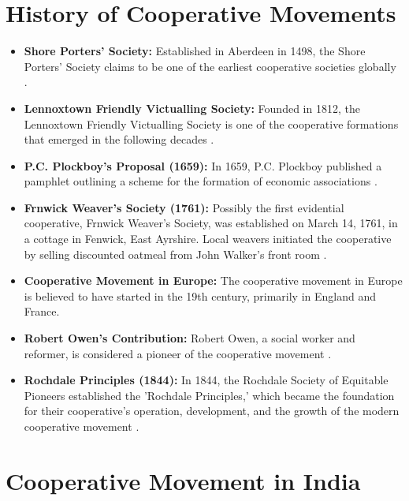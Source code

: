 
\section{History of Cooperative Movements}

\begin{itemize}
    \item \textbf{Shore Porters’ Society:} Established in Aberdeen in 1498, the Shore Porters’ Society claims to be one of the earliest cooperative societies globally \cite{WalesCC}.
    
    \item \textbf{Lennoxtown Friendly Victualling Society:} Founded in 1812, the Lennoxtown Friendly Victualling Society is one of the cooperative formations that emerged in the following decades \cite{Lennoxtown}.
    
    \item \textbf{P.C. Plockboy's Proposal (1659):} In 1659, P.C. Plockboy published a pamphlet outlining a scheme for the formation of economic associations \cite{Sampson1906}.
    
    \item \textbf{Frnwick Weaver's Society (1761):} Possibly the first evidential cooperative, Frnwick Weaver's Society, was established on March 14, 1761, in a cottage in Fenwick, East Ayrshire. Local weavers initiated the cooperative by selling discounted oatmeal from John Walker's front room \cite{Rediff}.
    
    \item \textbf{Cooperative Movement in Europe:} The cooperative movement in Europe is believed to have started in the 19th century, primarily in England and France.
    
    \item \textbf{Robert Owen's Contribution:} Robert Owen, a social worker and reformer, is considered a pioneer of the cooperative movement \cite{Infed}.
    
    \item \textbf{Rochdale Principles (1844):} In 1844, the Rochdale Society of Equitable Pioneers established the 'Rochdale Principles,' which became the foundation for their cooperative's operation, development, and the growth of the modern cooperative movement \cite{Carrell2007}.
\end{itemize}



\section{Cooperative Movement in India}


